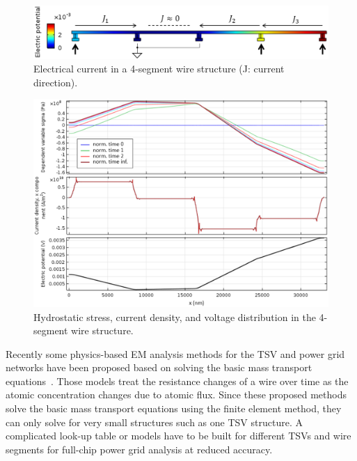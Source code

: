 \begin{figure}[h]
\centering
\includegraphics[width=0.95\columnwidth]{4seg_demo}
\caption{Electrical current in a 4-segment wire structure (J: current direction).}
\label{fig:4seg-demo}
\end{figure}

\begin{figure}[h]
\centering
\includegraphics[width=0.95\columnwidth]{4seg_multiplot}
\caption{Hydrostatic stress, current density, and voltage distribution in the 4-segment wire structure.}
\label{fig:4seg-multiplot}
\end{figure}


Recently some physics-based EM analysis methods for the
TSV and power grid networks have been proposed based on solving the
basic mass transport
equations~\cite{Pak:2011cx,Pathak:2011kz,Zhao:2013cv,Pak:2013bh}.
Those models treat the resistance changes of a wire over time as the
atomic concentration changes due to atomic flux. Since these proposed
methods solve the basic mass transport equations using the finite
element method, they can only solve for very small structures such as
one TSV structure. A complicated look-up table or models have to be
built for different TSVs and wire segments for full-chip power grid
analysis at reduced accuracy.

